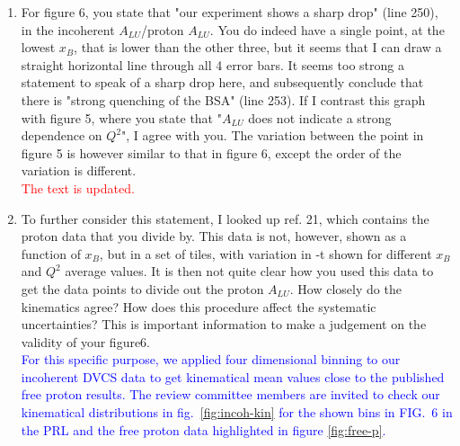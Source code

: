 \documentclass[a4paper,11pt,twoside]{article}
\begin{document}
\begin{enumerate}
  
\item    For figure 6, you state that "our experiment shows a sharp drop" (line 
   250), in the incoherent $A_{LU}$/proton $A_{LU}$. You do indeed have a 
      single point, at the lowest $x_B$, that is lower than the other three, 
      but it seems that I can draw a straight horizontal line through all 4 
      error bars. It seems too strong a statement to speak of a sharp drop 
      here, and subsequently conclude that there is "strong quenching of the 
      BSA" (line 253). If I contrast this graph with figure 5, where you state 
      that "$A_{LU}$ does not indicate a strong dependence on $Q^2$", I agree 
      with you. The variation between the point in figure 5 is however similar 
      to that in figure 6, except the order of the variation is different.\\ 
      \textcolor{red}{The text is updated. }



\item    To further consider this statement, I looked up ref. 21, which 
   contains the proton data that you divide by. This data is not, however, 
      shown as a function of $x_B$, but in a set of tiles, with variation in -t 
      shown for different $x_B$ and $Q^2$ average values. It is then not quite 
      clear how you used this data to get the data points to divide out the 
      proton $A_{LU}$. How closely do the kinematics agree? How does this 
      procedure affect the systematic uncertainties? This is important 
      information to make a judgement on the validity of your figure6.\\
   \textcolor{blue}{For this specific purpose, we applied four dimensional 
      binning to our incoherent DVCS data to get kinematical mean values close 
      to the published free proton results. The review committee members are 
      invited to check our kinematical distributions in 
      fig.~\ref{fig:incoh-kin} for the shown bins in FIG.~6 in the PRL and the 
      free proton data highlighted in figure \ref{fig:free-p}. }


\end{enumerate}
\end{document}
